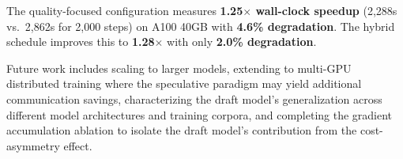 \documentclass[conference]{IEEEtran}
\begin{document}
The quality-focused configuration measures \textbf{1.25$\times$ wall-clock speedup} (2,288s vs.\ 2,862s for 2,000 steps) on A100 40GB with \textbf{4.6\% degradation}. The hybrid schedule improves this to \textbf{1.28$\times$} with only \textbf{2.0\% degradation}.

Future work includes scaling to larger models, extending to multi-GPU distributed training where the speculative paradigm may yield additional communication savings, characterizing the draft model's generalization across different model architectures and training corpora, and completing the gradient accumulation ablation to isolate the draft model's contribution from the cost-asymmetry effect.

\end{document}
